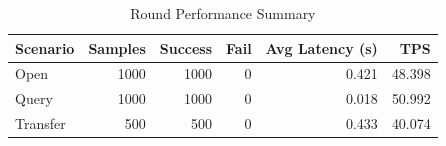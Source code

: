 \begin{table}
\caption{Round Performance Summary}
\label{tab:round_perf}
\begin{tabular}{lrrrrr}
\toprule
Scenario & Samples & Success & Fail & Avg Latency (s) & TPS \\
\midrule
Open & 1000 & 1000 & 0 & 0.421 & 48.398 \\
Query & 1000 & 1000 & 0 & 0.018 & 50.992 \\
Transfer & 500 & 500 & 0 & 0.433 & 40.074 \\
\bottomrule
\end{tabular}
\end{table}
